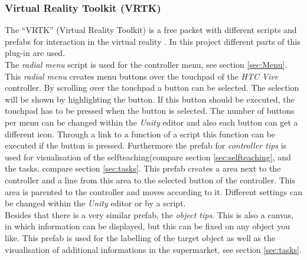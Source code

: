 	\subsubsection{Virtual Reality Toolkit (VRTK)}\label{sec:VRTK}
The ``VRTK'' (Virtual Reality Toolkit) is a free packet with different scripts and prefabs for interaction in the virtual reality \cite{asset_VRTK} \cite{VRTK}. In this project different parts of this plug-in are used.\\ 
The \textit{radial menu} script is used for the controller menu, see section \ref{sec:Menu}. This \textit{radial menu} creates menu buttons over the touchpad of the \textit{HTC Vive} controller. By scrolling over the touchpad a button can be selected. The selection will be shown by highlighting the button. If this button should be executed, the touchpad has to be pressed when the button is selected. The number of buttons per menu can be changed within the \textit{Unity} editor and also each button can get a different icon. Through a link to a function of a script this function can be executed if the button is pressed.
Furthermore the prefab for \textit{controller tips} is used for visualisation of the selfteaching(compare section \ref{sec:selfteaching}, and the tasks, compare section \ref{sec:tasks}. This prefab creates a area next to the controller and a line from this area to the selected button of the controller. This area is parented to the controller and moves according to it. Different settings can be changed within the \textit{Unity} editor or by a script.\\
Besides that there is a very similar prefab, the \textit{object tips}. This is also a canvas, in which information can be displayed, but this can be fixed on any object you like. This prefab is used for the labelling of the target object as well as the visualisation of additional informations in the supermarket, see section \ref{sec:tasks}.

	\newpage
